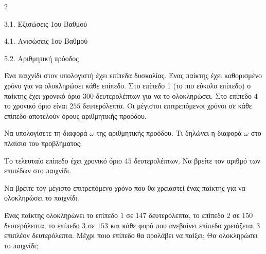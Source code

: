 \begin{ylh}{2}
    \item 3.1. Εξισώσεις 1ου Βαθμού
    \item 4.1. Ανισώσεις 1ου Βαθμού
    \item 5.2. Αριθμητική πρόοδος
\end{ylh}
Ένα παιχνίδι στον υπολογιστή έχει επίπεδα δυσκολίας. Ένας παίκτης έχει καθορισμένο χρόνο για να ολοκληρώσει κάθε επίπεδο. Στο επίπεδο 1 (το πιο εύκολο επίπεδο) ο παίκτης έχει χρονικό όριο $300$ δευτερολέπτων για να το ολοκληρώσει. Στο επίπεδο $4$ το χρονικό όριο είναι $255$ δευτερόλεπτα. Οι μέγιστοι επιτρεπόμενοι χρόνοι σε κάθε επίπεδο αποτελούν όρους αριθμητικής προόδου.
\begin{alist}
\item Να υπολογίσετε τη διαφορά $\omega$ της αριθμητικής προόδου. Τι δηλώνει η διαφορά $\omega$ στο πλαίσιο του προβλήματος;
\item Το τελευταίο επίπεδο έχει χρονικό όριο $45$ δευτερολέπτων. Να βρείτε τον αριθμό των επιπέδων στο παιχνίδι.
\item Να βρείτε τον μέγιστο επιτρεπόμενο χρόνο που θα χρειαστεί ένας παίκτης για να ολοκληρώσει το παιχνίδι.

\item Ένας παίκτης ολοκληρώνει το επίπεδο $1$ σε $147$ δευτερόλεπτα, το επίπεδο $2$ σε $150$ δευτερόλεπτα, το επίπεδο $3$ σε $153$ και κάθε φορά που ανεβαίνει επίπεδο χρειάζεται 3 επιπλέον δευτερόλεπτα. Μέχρι ποιο επίπεδο θα προλάβει να παίξει; Θα ολοκληρώσει το παιχνίδι;

\end{alist}

